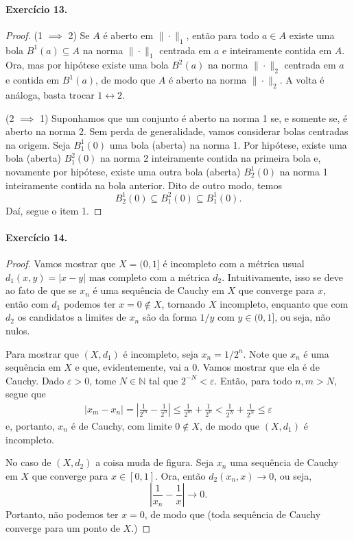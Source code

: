 \documentclass[12pt,a4paper]{article}
\begin{document}
\paragraph{Exercício 13.}
\begin{proof}
(1 $\implies$ 2) Se $A$ é aberto em $\|\cdot \|_1$, então para todo $a\in A$ existe uma bola $B^1(a)\subseteq A$ na norma 
$\|\cdot\|_1$ centrada em $a$ e inteiramente contida em $A$. Ora, mas por hipótese existe uma bola $B^2(a)$ 
na norma $\|\cdot\|_2$ centrada em $a$ e contida em $B^1(a)$, de modo que $A$ é aberto na norma $\|\cdot\|_2$. 
A volta é análoga, basta trocar $1 \leftrightarrow 2$.

(2 $\implies$ 1) Suponhamos que um conjunto é aberto na norma 1 se, e somente se, é aberto na norma 2. Sem perda de
generalidade, vamos considerar bolas centradas na origem. Seja $B_1^1(0)$ uma bola (aberta) na norma 1. Por hipótese,
existe uma bola (aberta) $B_1^2(0)$ na norma 2 inteiramente contida na primeira bola e, novamente por hipótese, existe
uma outra bola (aberta) $B_2^1(0)$ na norma 1 inteiramente contida na bola anterior. Dito de outro modo, temos
\begin{equation*}
    B_2^1(0) \subseteq B_1^2(0) \subseteq B_1^1(0).
\end{equation*}
Daí, segue o item 1.
\end{proof}

\paragraph{Exercício 14.}
\begin{proof}
Vamos mostrar que $X = (0,1]$ é incompleto com a métrica usual $d_1(x,y) = |x-y|$ mas completo com a métrica $d_2$. Intuitivamente,
isso se deve ao fato de que se $x_n$ é uma sequência de Cauchy em $X$ que converge para $x$, então com $d_1$ podemos ter
$x=0\notin X$, tornando $X$ incompleto, enquanto que com $d_2$ os candidatos a limites de $x_n$ são da forma $1/y$ com $y\in (0,1]$, ou seja, não nulos.

Para mostrar que $(X, d_1)$ é incompleto, seja $x_n = 1/2^n$. Note que $x_n$ é uma sequência em $X$ e que, evidentemente, vai 
a $0$. Vamos mostrar que ela é de Cauchy. Dado $\varepsilon > 0$, tome $N\in\mathbb{N}$ tal que $2^{-N} < \varepsilon$. Então, para todo $n,m > N$, segue que
\begin{align*}
    |x_m - x_n| = \left| \frac{1}{2^m} - \frac{1}{2^n} \right| \leq \frac{1}{2^m} + \frac{1}{2^n} < \frac{1}{2^N} + \frac{1}{2^N} 
    \leq \varepsilon
\end{align*}
e, portanto, $x_n$ é de Cauchy, com limite $0\notin X$, de modo que $(X, d_1)$ é incompleto.

No caso de $(X, d_2)$ a coisa muda de figura. Seja $x_n$ uma sequência de Cauchy em $X$ que converge para $x\in [0,1]$. Ora, então
$d_2(x_n,x) \to 0$, ou seja,
\begin{equation*}
    \left| \frac{1}{x_n} - \frac{1}{x} \right| \to 0.
\end{equation*}
Portanto, não podemos ter $x=0$, de modo que 
(toda sequência de Cauchy converge para um ponto de $X$.)
\end{proof}
\end{document}
